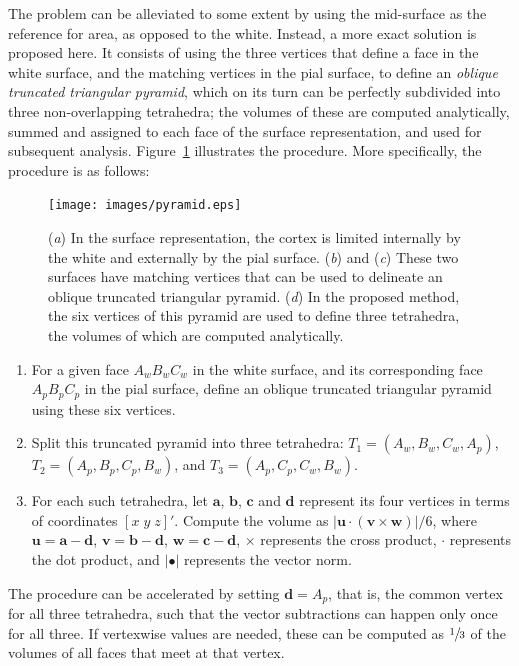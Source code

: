 The problem can be alleviated to some extent by using the mid-surface as the reference for area, as opposed to the white. Instead, a more exact solution is proposed here. It consists of using the three vertices that define a face in the white surface, and the matching vertices in the pial surface, to define an \emph{oblique truncated triangular pyramid}, which on its turn can be perfectly subdivided into three non-overlapping tetrahedra; the volumes of these are computed analytically, summed and assigned to each face of the surface representation, and used for subsequent analysis. Figure~\ref{fig:areal:pyramid} illustrates the procedure. More specifically, the procedure is as follows:

\begin{figure}[!tp]
\centering
\texttt{[image: images/pyramid.eps]}
\caption[Proposed method to compute volumes in the cortex.]{(\emph{a}) In the surface representation, the cortex is limited internally by the white and externally by the pial surface. (\emph{b}) and (\emph{c}) These two surfaces have matching vertices that can be used to delineate an oblique truncated triangular pyramid. (\emph{d}) In the proposed method, the six vertices of this pyramid are used to define three tetrahedra, the volumes of which are computed analytically.}
\label{fig:areal:pyramid}
\end{figure}

\begin{enumerate}
\item For a given face $A_w B_w C_w$ in the white surface, and its corresponding face $A_p B_p C_p$ in the pial surface, define an oblique truncated triangular pyramid using these six vertices.
\item Split this truncated pyramid into three tetrahedra: $T_1 = (A_w,B_w,C_w,A_p)$, $T_2 = (A_p,B_p,C_p,B_w)$, and $T_3 = (A_p,C_p,C_w,B_w)$.
\item For each such tetrahedra, let $\mathbf{a}$, $\mathbf{b}$, $\mathbf{c}$ and $\mathbf{d}$ represent its four vertices in terms of coordinates $[x\;y\;z]'$. Compute the volume as $|\mathbf{u}\cdot(\mathbf{v} \times \mathbf{w})|/6$, where $\mathbf{u} = \mathbf{a}-\mathbf{d}$, $\mathbf{v} = \mathbf{b}-\mathbf{d}$, $\mathbf{w} = \mathbf{c}-\mathbf{d}$, $\times$ represents the cross product, $\cdot$ represents the dot product, and $|\bullet|$ represents the vector norm.
\end{enumerate}

The procedure can be accelerated by setting $\mathbf{d}=A_p$, that is, the common vertex for all three tetrahedra, such that the vector subtractions can happen only once for all three. If vertexwise values are needed, these can be computed as $\sfrac{1}{3}$ of the volumes of all faces that meet at that vertex.

